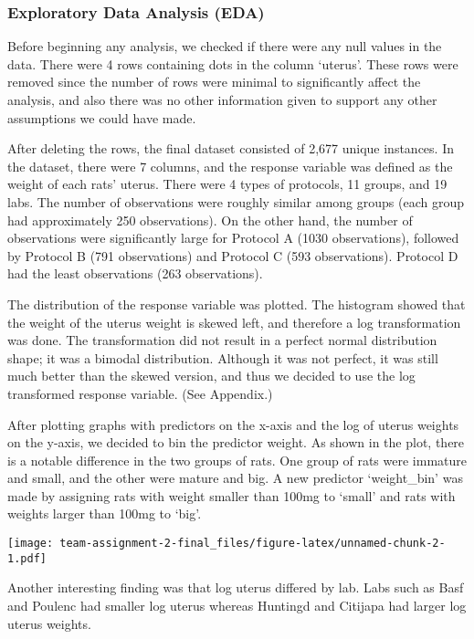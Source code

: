 \documentclass[
]{article}
\begin{document}
\hypertarget{exploratory-data-analysis-eda}{%
\subsubsection{Exploratory Data Analysis
(EDA)}\label{exploratory-data-analysis-eda}}

Before beginning any analysis, we checked if there were any null values
in the data. There were 4 rows containing dots in the column `uterus'.
These rows were removed since the number of rows were minimal to
significantly affect the analysis, and also there was no other
information given to support any other assumptions we could have made.

After deleting the rows, the final dataset consisted of 2,677 unique
instances. In the dataset, there were 7 columns, and the response
variable was defined as the weight of each rats' uterus. There were 4
types of protocols, 11 groups, and 19 labs. The number of observations
were roughly similar among groups (each group had approximately 250
observations). On the other hand, the number of observations were
significantly large for Protocol A (1030 observations), followed by
Protocol B (791 observations) and Protocol C (593 observations).
Protocol D had the least observations (263 observations).

The distribution of the response variable was plotted. The histogram
showed that the weight of the uterus weight is skewed left, and
therefore a log transformation was done. The transformation did not
result in a perfect normal distribution shape; it was a bimodal
distribution. Although it was not perfect, it was still much better than
the skewed version, and thus we decided to use the log transformed
response variable. (See Appendix.)

After plotting graphs with predictors on the x-axis and the log of
uterus weights on the y-axis, we decided to bin the predictor weight. As
shown in the plot, there is a notable difference in the two groups of
rats. One group of rats were immature and small, and the other were
mature and big. A new predictor `weight\_bin' was made by assigning rats
with weight smaller than 100mg to `small' and rats with weights larger
than 100mg to `big'.

\texttt{[image: team-assignment-2-final\_files/figure-latex/unnamed-chunk-2-1.pdf]}

Another interesting finding was that log uterus differed by lab. Labs
such as Basf and Poulenc had smaller log uterus whereas Huntingd and
Citijapa had larger log uterus weights.
\end{document}

